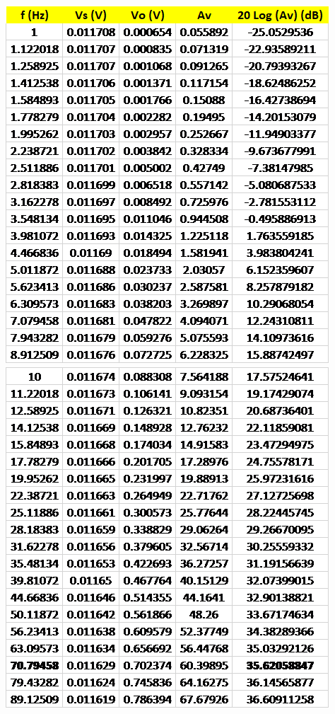 \documentclass{article}
\begin{document}
	\pagebreak
	\begin{table}[!ht]
		\centering
		\includegraphics[width=0.4\textheight]{data_cascode_gain.png}
		\includegraphics[width=0.4\textheight]{data_cascode_gain_1.png}
		\label{t:4}
	\end{table}
\end{document}

